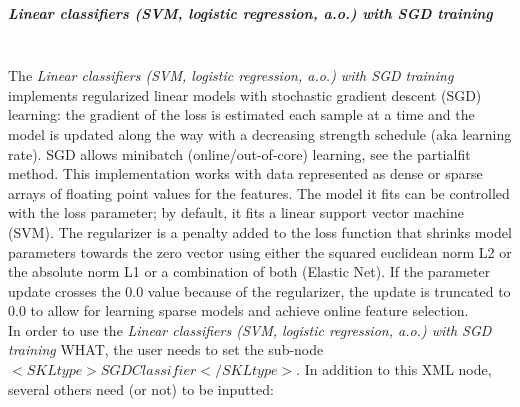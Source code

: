 \subparagraph{Linear classifiers (SVM, logistic regression, a.o.) with SGD training}
\mbox{}
\\The \textit{Linear classifiers (SVM, logistic regression, a.o.) with SGD training} implements regularized linear models with stochastic gradient descent (SGD) learning: the gradient of the loss is estimated each sample at a time and the model is updated along the way with a decreasing strength schedule (aka learning rate). SGD allows minibatch (online/out-of-core) learning, see the partial\textunderscore fit method.
This implementation works with data represented as dense or sparse arrays of floating point values for the features. The model it fits can be controlled with the loss parameter; by default, it fits a linear support vector machine (SVM).
The regularizer is a penalty added to the loss function that shrinks model parameters towards the zero vector using either the squared euclidean norm L2 or the absolute norm L1 or a combination of both (Elastic Net). If the parameter update crosses the 0.0 value because of the regularizer, the update is truncated to 0.0 to allow for learning sparse models and achieve online feature selection.
\\In order to use the \textit{Linear classifiers (SVM, logistic regression, a.o.) with SGD training} WHAT, the user needs to set the sub-node $<SKLtype>SGDClassifier</SKLtype>$.
In addition to this XML node, several others need (or not) to be inputted:
